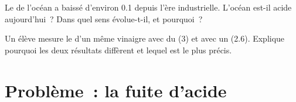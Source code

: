 \begin{exercise}[$\star\star\star$]\label{exo:g9:acids-bases-ph:11}
Le  de l'océan a baissé d'environ 0.1 depuis l'ère industrielle.
L'océan est-il acide aujourd'hui~? Dans quel sens évolue-t-il, et
pourquoi~?
\end{exercise}

\begin{exercise}[$\star\star\star$]\label{exo:g9:acids-bases-ph:12}
Un élève mesure le  d'un même vinaigre avec du  (3) et avec
un  (2.6). Explique pourquoi les deux résultats diffèrent et
lequel est le plus précis.
\end{exercise}

\section{Problème~: la fuite d'acide}

